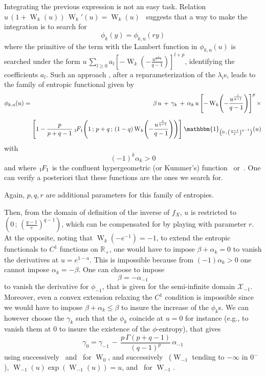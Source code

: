 \documentclass[entropy,article,submit,moreauthors,pdftex]{Definitions/mdpi}
\newcommand{\SZ}[1]{{\color{blue} #1}}                                       %
\def\Rset{\mathbb{R}}%
\def\X{\mathcal{X}}%
\def\un{\mathbbm{1}}%
\def\W{\operatorname{W}} %
\newcommand{\hypgeom}[2]{\mbox{}_{#1}\hspace{-1pt}F_{#2}}%
\def\u{\mathrm{u}}
\begin{document}
Integrating  the previous  expression  is  not an  easy  task.   Relation $u  \,
(1+\W_k(u)) \, \W_k'(u) =  \W_k(u)$~\cite[Eq.~3.2]{CorGon96} suggests that a way
to make the integration is to search for\SZ{
%
\[
\phi_k(y) = \phi_{k,\u}\left( r y \right)
\]
%
where the primitive  of the term with the Lambert  function in} $\phi_{k,\u}(u)$
is searched  \SZ{under the form  $u \, \sum_{l \ge  0} a_l \left[-  \W_k\left( -
    \frac{u^{\frac{1}{q-1}}}{q-1}   \right)   \right]^{l+p}$,  identifying   the
  coefficients $a_l$.}  Such  an approach\SZ{, after a  reparameterization of the
  $\lambda_i$s,} leads to the family of entropic functional \SZ{given by}
%
\begin{eqnarray*}
\phi_{k,\u}(u) & = & \beta \, u \, + \, \gamma_k \, + \, \alpha_k \, u \, \left[
  - \W_k\left( - \frac{u^{\frac{1}{q-1}}}{q-1} \right) \right]^p \, \times
\\[2.5mm]
&&\hspace{-2.5mm}\left[ 1 - \frac{p}{p+q-1} \:
  \hypgeom{1}{1}\left(  1 \,  ; \,  p+q \,  ; \,  (1-q) \W_k  \left( -
  \frac{u^{\frac{1}{q-1}}}{q-1}  \right)   \right)  \right] \: \un_{\left(  0   \,  ;  \,
  \left( \frac{q-1}{e} \right)^{q-1} \right)}(u)
\end{eqnarray*}
%
\SZ{with $$(-1)^k  \alpha_k >  0$$ and where  $\hypgeom{1}{1}$ is  the confluent
  hypergeometric       (or       Kummer's)       function~\cite[\S~13]{AbrSte70}
  or~\cite[\S~9.2]{GraRyz15}}.  One can verify a posteriori that these functions
are the ones we search for.

\SZ{Again, $p, q, r$ are additional parameters for this family of entropies.

  Then, from the domain of definition of the inverse of $f_X$, $u$ is restricted
  to $\left( 0 \, ; \, \left( \frac{q-1}{e} \right)^{q-1} \right)$, which can be
  compensated for by  playing with parameter $r$.  At the  opposite, noting that
  $\W_k\left( -e^{-1} \right) = -1$, to extend the entropic functionals to $C^1$
  functions on  $\Rset_+$, one would  have to impose $\beta  + \alpha_k =  0$ to
  vanish the derivatives at $u = e^{1-a}$. This is impossible because from $(-1)
  \alpha_k >  0$ one  cannot impose  $\alpha_k =  - \beta$.   One can  choose to
  impose $$\beta  = -  \alpha_{-1}$$ to vanish  the derivative  for $\phi_{-1}$,
  that is given for the semi-infinite  domain $\X_{-1}$. Moreover, even a convex
  extension relaxing  the $C^1$ condition is  impossible since we would  have to
  impose $\beta +  \alpha_k \le \beta$ to insure the  increase of the $\phi_k$s.
  We can however choose  the $\gamma_k$ such that the $\phi_k$  coincide at $u =
  0$ for instance  (e.g., to vanish them  at $0$ to insure the  existence of the
  $\phi$-entropy), that gives
%
\[
\gamma_0  = \gamma_{-1} \, -  \, \frac{p \, \Gamma(p+q-1)}{(q-1)^p} \,
\alpha_{-1}
\]
%
using successively~\cite[Eq.~3.1]{CorGon96}  and~\cite[Eq.~13.1.2]{AbrSte70} for
$\W_0$,  and  successively~\cite[Eq.~13.1.4]{AbrSte70}   ($\W_{-1}$  tending  to
$-\infty$ in  $0^{-}$), $\W_{-1}(u) \exp(\W_{-1}(u)) =  u$, and~\cite[Eq.~4.6 \&
  lines that  follow]{CorGon96} for  $\W_{-1}$.
}
\end{document}
